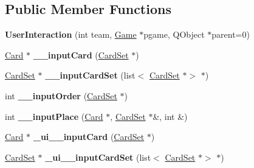 \subsection*{Public Member Functions}
\begin{DoxyCompactItemize}
\item 
\mbox{\label{class_user_interaction_a4aeac47b93a4faf9bfc28e1a9c82ae31}} 
{\bfseries User\+Interaction} (int team, \hyperlink{class_game}{Game} $\ast$pgame, Q\+Object $\ast$parent=0)
\item 
\mbox{\label{class_user_interaction_a649516d648a3c6e06cf66b676ec57e0f}} 
\hyperlink{class_card}{Card} $\ast$ {\bfseries \+\_\+\+\_\+input\+Card} (\hyperlink{class_card_set}{Card\+Set} $\ast$)
\item 
\mbox{\label{class_user_interaction_a0c2e1a09df22e3980ddc62dd9af81441}} 
\hyperlink{class_card_set}{Card\+Set} $\ast$ {\bfseries \+\_\+\+\_\+input\+Card\+Set} (list$<$ \hyperlink{class_card_set}{Card\+Set} $\ast$$>$ $\ast$)
\item 
\mbox{\label{class_user_interaction_a5a7ad04bed1d90079e9995b5e3d43640}} 
int {\bfseries \+\_\+\+\_\+input\+Order} (\hyperlink{class_card_set}{Card\+Set} $\ast$)
\item 
\mbox{\label{class_user_interaction_a3e439e45021b61aadaeac96141591c94}} 
int {\bfseries \+\_\+\+\_\+input\+Place} (\hyperlink{class_card}{Card} $\ast$, \hyperlink{class_card_set}{Card\+Set} $\ast$\&, int \&)
\item 
\mbox{\label{class_user_interaction_a60395e8e99825cb9c5ec1a8419bab2f6}} 
\hyperlink{class_card}{Card} $\ast$ {\bfseries \+\_\+ui\+\_\+\+\_\+input\+Card} (\hyperlink{class_card_set}{Card\+Set} $\ast$)
\item 
\mbox{\label{class_user_interaction_a45e2793a7aa18a8a9a728f7d92672d89}} 
\hyperlink{class_card_set}{Card\+Set} $\ast$ {\bfseries \+\_\+ui\+\_\+\+\_\+input\+Card\+Set} (list$<$ \hyperlink{class_card_set}{Card\+Set} $\ast$$>$ $\ast$)
\item 
\mbox{\label{class_user_interaction_afe4b8dcee3622346491141d7052b9aca}} 

\end{DoxyCompactItemize}
